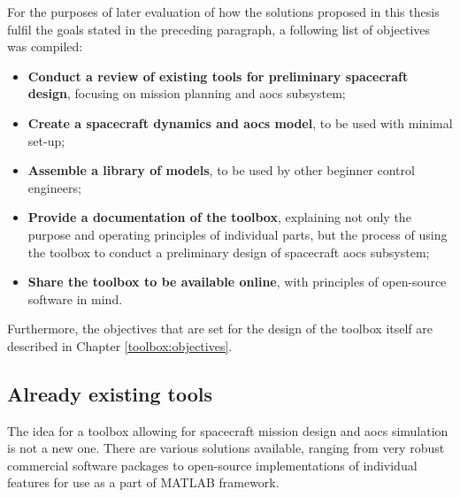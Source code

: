     For the purposes of later evaluation of how the solutions proposed in this thesis fulfil the goals stated in the preceding paragraph, a following list of objectives was compiled:

    \begin{itemize}
        \item \textbf{Conduct a review of existing tools for preliminary spacecraft design}, focusing on mission planning and \ac{aocs} subsystem;
        \item \textbf{Create a spacecraft dynamics and \ac{aocs} model}, to be used with minimal set-up;
        \item \textbf{Assemble a library of models}, to be used by other beginner control engineers;
        \item \textbf{Provide a documentation of the toolbox}, explaining not only the purpose and operating principles of individual parts, but the process of using the toolbox to conduct a preliminary design of spacecraft \ac{aocs} subsystem;
        \item \textbf{Share the toolbox to be available online}, with principles of open-source software in mind.
    \end{itemize}

    Furthermore, the objectives that are set for the design of the toolbox itself are described in Chapter \ref{toolbox:objectives}.


\subsection{Already existing tools}\label{sec:review}

    The idea for a toolbox allowing for spacecraft mission design and \ac{aocs} simulation is not a new one. There are various solutions available, ranging from very robust commercial software packages to open-source implementations of individual features for use as a part of MATLAB framework.

